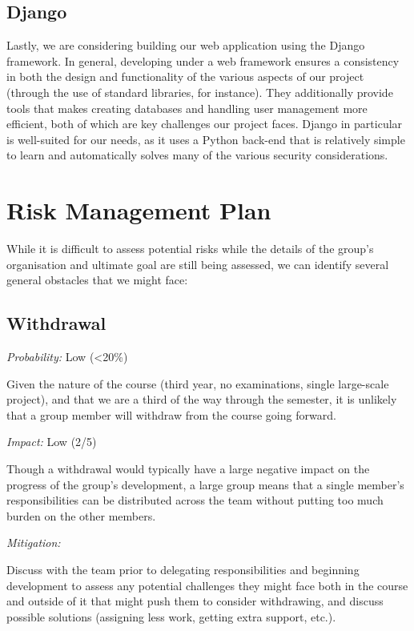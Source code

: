\documentclass[11pt]{article}
\begin{document}
\subsection{Django}
Lastly, we are considering building our web application using the Django framework. In general,
developing under a web framework ensures a consistency in both the design and functionality of the
various aspects of our project (through the use of standard libraries, for instance). They
additionally provide tools that makes creating databases and handling user management more
efficient, both of which are key challenges our project faces. Django in particular is well-suited
for our needs, as it uses a Python back-end that is relatively simple to learn and automatically
solves many of the various security considerations.

\section{Risk Management Plan}

While it is difficult to assess potential risks while the details of the group's organisation and
ultimate goal are still being assessed, we can identify several general obstacles that
we might face:

\subsection{Withdrawal}
\textit{Probability:} Low (\textless20\%) \begin{addmargin}[1em]{2em} Given the nature of the course
(third year, no examinations, single large-scale project), and that we are a third of the way
through the semester, it is unlikely that a group member will withdraw from the course going
forward.\end{addmargin}\vspace{2mm}
\noindent \textit{Impact:} Low (2/5) \begin{addmargin}[1em]{2em}Though a withdrawal would
typically have a large negative impact on the progress of the group’s development, a large group
means that a single member’s responsibilities can be distributed across the team without putting too
much burden on the other members.\end{addmargin}\vspace{2mm}
\noindent \textit{Mitigation:} \begin{addmargin}[1em]{2em} Discuss with the team prior to delegating
responsibilities and beginning development to assess any potential challenges they might face both
in the course and outside of it that might push them to consider withdrawing, and
discuss possible solutions (assigning less work, getting extra support, etc.).\end{addmargin}
\end{document}
